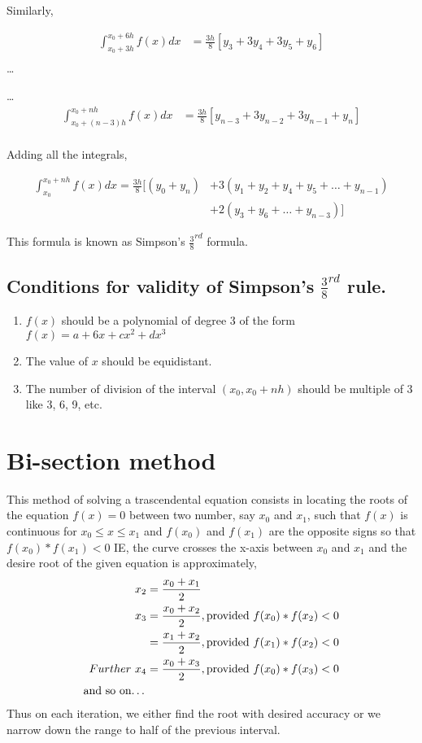 \documentclass{article}
\begin{document}
    Similarly,
    
    \begin{align*}
      \int_{x_0+3h}^{x_0+6h}f(x)dx &= \frac{3h}{8}[y_3+3y_4+3y_5+y_6]\\
    \end{align*}
    \dots
    
    \dots
    \begin{align*}
      \int_{x_0+(n-3)h}^{x_0+nh}f(x)dx &= \frac{3h}{8}[y_{n-3}+3y_{n-2}+3y_{n-1}+y_n]\\
    \end{align*}
    
    Adding all the integrals,
    
    \begin{align*}
      \int_{x_0}^{x_0+nh}f(x)dx=\frac{3h}{8}[(y_0+y_n) &+ 3(y_1+y_2+y_4+y_5+\dots+y_{n-1})\\
                                                       &+ 2(y_3+y_6+\dots+y_{n-3})]
    \end{align*}

    This formula is known as Simpson's $\frac{3}{8}^{rd}$ formula.
    
    \subsection{Conditions for validity of Simpson's $\frac{3}{8}^{rd}$ rule.}

    \begin{enumerate}
      \item $f(x)$ should be a polynomial of degree 3 of the form 
        $f(x)=a+6x+cx^2+dx^3$
      \item The value of $x$ should be equidistant.
      \item The number of division of the interval $(x_0,x_0+nh)$
        should be multiple of 3 like 3, 6, 9, etc.
    \end{enumerate}

    \section{Bi-section method}
    This method of solving a trascendental equation consists in locating the roots of the equation $f(x)=0$ between two number, say $x_0$ and $x_1$, such that $f(x)$ is continuous for $x_0\leq x\leq x_1$ and $f(x_0)$ and $f(x_1)$ are the opposite signs so that $f(x_0)*f(x_1)<0$ IE, the curve
    crosses the x-axis between $x_0$ and $x_1$ and the desire root of the given equation is approximately,
    \begin{align*}
               x_2 &= \frac{x_0+x_1}{2}\\
               x_3 &= \frac{x_0+x_2}{2},\text{provided $f(x_0)*f(x_2)<0$}\\
                   &= \frac{x_1+x_2}{2},\text{provided $f(x_1)*f(x_2)<0$}\\
      Further\ x_4 &= \frac{x_0+x_3}{2},\text{provided $f(x_0)*f(x_3)<0$}\\
      \text{and so on\dots}
    \end{align*}
    Thus on each iteration, we either find the root with desired accuracy or we narrow down the range to half of the previous interval.



\end{document}
